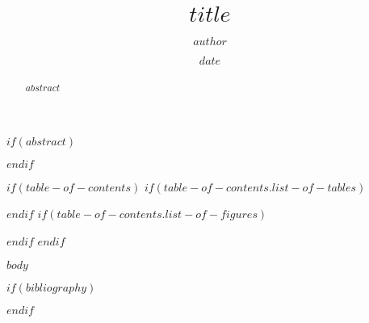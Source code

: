 \documentclass[
    $if(paper-size)$
        $paper-size$paper,
    $endif$
    $if(font.size)$
        $font.size$,
    $endif$
    $if(columns)$
        $columns$column,
    $endif$
    $if(title-page)$
        titlepage,
    $endif$
    $if(draft)$
        draft,
    $endif$
]
{$document-type$}
\title{$title$}
\author{$author$}
\date{$date$}
\begin{document}
\maketitle

$if(abstract)$
    \begin{abstract}
        $abstract$
    \end{abstract}
$endif$

$if(table-of-contents)$
    \setcounter{tocdepth}{$table-of-contents.depth$}
    \tableofcontents
    $if(table-of-contents.list-of-tables)$
        \listoftables
    $endif$
    $if(table-of-contents.list-of-figures)$
        \listoffigures
    $endif$
$endif$

$body$

$if(bibliography)$
    
$endif$
\end{document}
